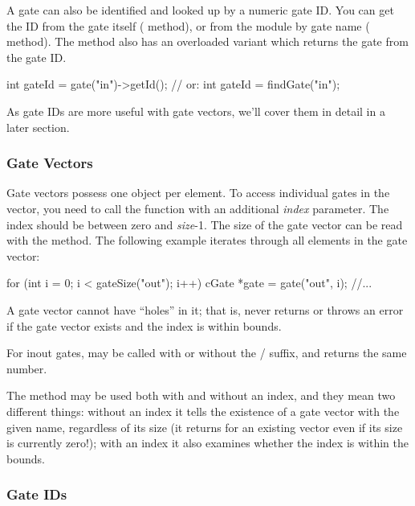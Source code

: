 A gate can also be identified and looked up by a numeric gate ID.
You can get the ID from the gate itself ( method),
or from the module by gate name ( method).
The  method also has an overloaded variant which
returns the gate from the gate ID.

\begin{cpp}
int gateId = gate("in")->getId();  // or:
int gateId = findGate("in");
\end{cpp}

As gate IDs are more useful with gate vectors, we'll cover them
in detail in a later section.


\subsubsection{Gate Vectors}
\label{sec:simple-modules:gate-vectors}

Gate vectors possess one  object per element.
To access individual gates in the vector, you need to call
the  function with an additional \textit{index}
parameter. The index should be between zero and \textit{size}-1.
The size of the gate vector can be read with the 
method. The following example iterates through all elements in the
gate vector:

\begin{cpp}
for (int i = 0; i < gateSize("out"); i++) {
    cGate *gate = gate("out", i);
    //...
}
\end{cpp}

A gate vector cannot have ``holes'' in it; that is, 
never returns  or throws an error if the gate vector exists
and the index is within bounds.

For inout gates,  may be called with or without
the / suffix, and returns the same number.

The  method may be used both with and without an
index, and they mean two different things: without an index it tells
the existence of a gate vector with the given name, regardless of its
size (it returns  for an existing vector even if its size
is currently zero!); with an index it also examines whether the index
is within the bounds.


\subsubsection{Gate IDs}
\label{sec:simple-modules:gate-ids}

